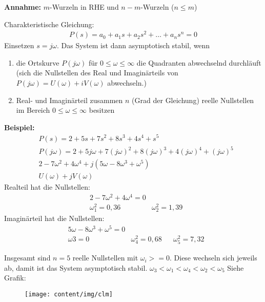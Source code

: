 \begin{tcolorbox}[colback=white!10!white,colframe=green!30!black,title=CLM Kriterium] 
    \textbf{Annahme:}
    $m$-Wurzeln in RHE  und $n-m$-Wurzeln ($n \leq m$)
    
    Charakteristische Gleichung:
    \begin{align*}
        P(s) = a_0 + a_1s + a_2s^2 + \ldots + a_n s^n = 0 
    \end{align*}
    Einsetzen $s = j\omega$. 
    Das System ist dann asymptotisch stabil, wenn
    \begin{enumerate}
        \item die Ortskurve $P(j\omega)$  für $0 \leq \omega \leq \infty$ die Quadranten abwechselnd durchläuft (sich die Nullstellen des Real und Imaginärteils von $P(j\omega) = U(\omega)+iV(\omega)$ abwechseln.) 
        \item Real- und Imaginärteil zusammen $n$ (Grad der Gleichung) reelle Nullstellen im Bereich $0 \leq \omega \leq \infty$ besitzen 
    \end{enumerate} 
    
    
    
    
    \tcblower
    
    \textbf{Beispiel:}
    \begin{align*}
        &P(s) = 2 + 5s +7s^2 +8s^3 +4s^4 +s^5\\
        &P(j\omega) = 2 + 5j\omega + 7(j\omega)^2 +8 (j\omega)^3 + 4 (j\omega)^4 + (j\omega)^5\\
        &2-7\omega^2 +4\omega^4 + j (5\omega - 8\omega^3 +\omega^5)\\
        &U(\omega) + jV(\omega)
    \end{align*}
    Realteil hat die Nullstellen:
    \begin{align*}
        &2-7\omega^2 +4\omega^4 = 0 \\
        &\omega_1^2 = 0,36 & \omega_2^2= 1,39
    \end{align*}
        Imaginärteil hat die Nullstellen:
        \begin{align*}
        &5\omega - 8\omega^3 +\omega^5= 0 \\
        &\omega3 = 0  & \omega_4^2= 0,68 & & \omega_5^2= 7,32 
        \end{align*}
        
        Insgesamt sind $n=5$ reelle Nullstellen mit $\omega_i >= 0$. Diese wechseln sich jeweils ab, damit ist das System asymptotisch stabil. $\omega_3 < \omega_1 < \omega_4 < \omega_2 < \omega_5$ Siehe Grafik:
        \begin{figure}[H]
\centering
\texttt{[image: content/img/clm]}
\label{fig:clm}
\end{figure}

        
\end{tcolorbox}

